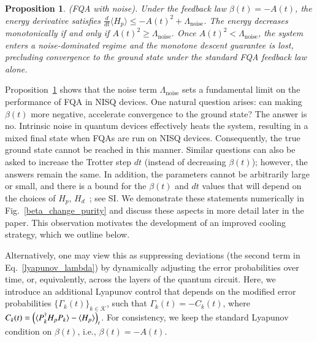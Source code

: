 \documentclass[10pt, superscriptaddress,aps,pra,twocolumn,showpacs,nofootinbib, longbibliography, notitlepage,floatfix]{revtex4-2}
\newtheorem{proposition}{Proposition}
\begin{document}
{
\begin{proposition}
(FQA with noise). Under the feedback law $\beta(t)= -A(t)$, the energy derivative satisfies $\frac{d}{dt}\langle H_p \rangle \leq -A(t)^2 + \Lambda_\mathrm{noise}$. The energy decreases monotonically if and only if $A(t)^2 \geq \Lambda_\mathrm{noise}$. Once $A(t)^2 < \Lambda_\mathrm{noise}$, the system enters a noise-dominated regime and the monotone descent guarantee is lost, precluding convergence to the ground state under the standard FQA feedback law alone.
\label{prop:fqa_noise}
\end{proposition}}

{Proposition~\ref{prop:fqa_noise} shows that the noise term $\Lambda_\mathrm{noise}$ sets a fundamental limit on the performance of FQA in NISQ devices.} One natural question arises: can making $\beta(t)$ more negative, accelerate convergence to the ground state? The answer is no. Intrinsic noise in quantum devices effectively heats the system, resulting in a mixed final state when FQAs are run on NISQ devices. Consequently, the true ground state cannot be reached in this manner. Similar questions can also be asked to increase the Trotter step $dt$ (instead of decreasing $\beta(t)$); however, the answers remain the same. In addition, the parameters cannot be arbitrarily large or small, and there is a bound for the $\beta(t)$ and $dt$ values that will depend on the choices of $H_p$, $H_d$~\cite{Magann_PRA_2022, Larsen_prr}; see SI. We demonstrate these statements numerically in Fig.~\ref{beta_change_purity} and discuss these aspects in more detail later in the paper. This observation motivates the development of an improved cooling strategy, which we outline below.

Alternatively, one may view this as suppressing deviations (the second term in Eq.~\eqref{lyapunov_lambda}) by dynamically adjusting the error probabilities over time, or, equivalently, across the layers of the quantum circuit. Here, we introduce an additional Lyapunov control that depends on the modified error probabilities $\{\Gamma_k(t)\}_{k\in\mathcal{K}}$, such that $\Gamma_k(t) = - C_k(t)$, where $C_k(t) = \left(\braket{ P_k^\dagger H_p P_k } - \braket{H_p}\right)_t$. For consistency, we keep the standard Lyapunov condition on $\beta(t)$, i.e., $\beta(t) = -A(t)$. 
\end{document}
